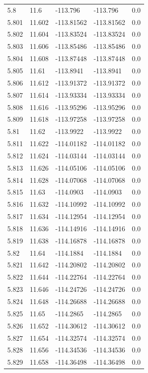 \begin{tabular}{lllll}
5.8 & 11.6 & -113.796 & -113.796 & 0.0 \\
5.801 & 11.602 & -113.81562 & -113.81562 & 0.0 \\
5.802 & 11.604 & -113.83524 & -113.83524 & 0.0 \\
5.803 & 11.606 & -113.85486 & -113.85486 & 0.0 \\
5.804 & 11.608 & -113.87448 & -113.87448 & 0.0 \\
5.805 & 11.61 & -113.8941 & -113.8941 & 0.0 \\
5.806 & 11.612 & -113.91372 & -113.91372 & 0.0 \\
5.807 & 11.614 & -113.93334 & -113.93334 & 0.0 \\
5.808 & 11.616 & -113.95296 & -113.95296 & 0.0 \\
5.809 & 11.618 & -113.97258 & -113.97258 & 0.0 \\
5.81 & 11.62 & -113.9922 & -113.9922 & 0.0 \\
5.811 & 11.622 & -114.01182 & -114.01182 & 0.0 \\
5.812 & 11.624 & -114.03144 & -114.03144 & 0.0 \\
5.813 & 11.626 & -114.05106 & -114.05106 & 0.0 \\
5.814 & 11.628 & -114.07068 & -114.07068 & 0.0 \\
5.815 & 11.63 & -114.0903 & -114.0903 & 0.0 \\
5.816 & 11.632 & -114.10992 & -114.10992 & 0.0 \\
5.817 & 11.634 & -114.12954 & -114.12954 & 0.0 \\
5.818 & 11.636 & -114.14916 & -114.14916 & 0.0 \\
5.819 & 11.638 & -114.16878 & -114.16878 & 0.0 \\
5.82 & 11.64 & -114.1884 & -114.1884 & 0.0 \\
5.821 & 11.642 & -114.20802 & -114.20802 & 0.0 \\
5.822 & 11.644 & -114.22764 & -114.22764 & 0.0 \\
5.823 & 11.646 & -114.24726 & -114.24726 & 0.0 \\
5.824 & 11.648 & -114.26688 & -114.26688 & 0.0 \\
5.825 & 11.65 & -114.2865 & -114.2865 & 0.0 \\
5.826 & 11.652 & -114.30612 & -114.30612 & 0.0 \\
5.827 & 11.654 & -114.32574 & -114.32574 & 0.0 \\
5.828 & 11.656 & -114.34536 & -114.34536 & 0.0 \\
5.829 & 11.658 & -114.36498 & -114.36498 & 0.0 \\

\end{tabular}
